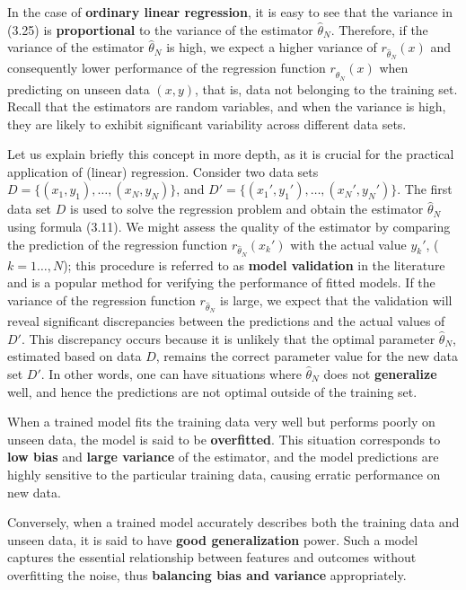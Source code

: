 \documentclass{report}
\begin{document}
In the case of \textbf{ordinary linear regression}, it is easy to see that the variance in (3.25) is \textbf{proportional} to the variance of the estimator $\hat{\theta}_N$. Therefore, if the variance of the estimator $\hat{\theta}_N$ is high, we expect a higher variance of $r_{\hat{\theta}_N}(x)$ and consequently lower performance of the regression function $r_{\hat{\theta}_N}(x)$ when predicting on unseen data $(x, y)$, that is, data not belonging to the training set. Recall that the estimators are random variables, and when the variance is high, they are likely to exhibit significant variability across different data sets.

Let us explain briefly this concept in more depth, as it is crucial for the practical application of (linear) regression. Consider two data sets $D = \{(x_1,y_1),\dots,(x_N,y_N)\}$, and $D' = \{(x_1',y_1'),\dots,(x_N',y_N')\}$. The first data set $D$ is used to solve the regression problem and obtain the estimator $\hat{\theta}_N$ using formula (3.11). We might assess the quality of the estimator by comparing the prediction of the regression function $r_{\hat{\theta}_N}(x_k')$ with the actual value $y_k'$, ($k = 1\dots,N$); this procedure is referred to as \textbf{model validation} in the literature and is a popular method for verifying the performance of fitted models. If the variance of the regression function $r_{\hat{\theta}_N}$ is large, we expect that the validation will reveal significant discrepancies between the predictions and the actual values of $D'$. This discrepancy occurs because it is unlikely that the optimal parameter $\hat{\theta}_N$, estimated based on data $D$, remains the correct parameter value for the new data set $D'$. In other words, one can have situations where $\hat{\theta}_N$ does not \textbf{generalize} well, and hence the predictions are not optimal outside of the training set.

When a trained model fits the training data very well but performs poorly on unseen data, the model is said to be \textbf{overfitted}. This situation corresponds to \textbf{low bias} and \textbf{large variance} of the estimator, and the model predictions are highly sensitive to the particular training data, causing erratic performance on new data.

Conversely, when a trained model accurately describes both the training data and unseen data, it is said to have \textbf{good generalization} power. Such a model captures the essential relationship between features and outcomes without overfitting the noise, thus \textbf{balancing bias and variance} appropriately.
\end{document}
